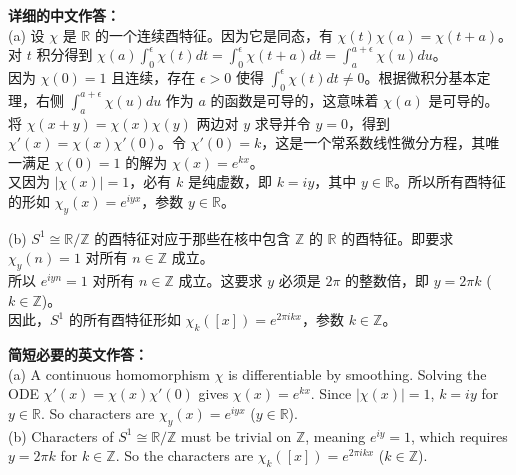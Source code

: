 \documentclass{ctexart}
\begin{document}
\vspace{1em}
\textbf{详细的中文作答：}\\
(a) 设 $\chi$ 是 $\mathbb{R}$ 的一个连续酉特征。因为它是同态，有 $\chi(t) \chi(a) = \chi(t+a)$。对 $t$ 积分得到 $\chi(a) \int_0^\epsilon \chi(t)dt = \int_0^\epsilon \chi(t+a)dt = \int_a^{a+\epsilon} \chi(u)du$。\\
因为 $\chi(0)=1$ 且连续，存在 $\epsilon > 0$ 使得 $\int_0^\epsilon \chi(t)dt \neq 0$。根据微积分基本定理，右侧 $\int_a^{a+\epsilon} \chi(u)du$ 作为 $a$ 的函数是可导的，这意味着 $\chi(a)$ 是可导的。\\
将 $\chi(x+y) = \chi(x)\chi(y)$ 两边对 $y$ 求导并令 $y=0$，得到 $\chi'(x) = \chi(x)\chi'(0)$。令 $\chi'(0) = k$，这是一个常系数线性微分方程，其唯一满足 $\chi(0)=1$ 的解为 $\chi(x) = e^{kx}$。\\
又因为 $|\chi(x)| = 1$，必有 $k$ 是纯虚数，即 $k = iy$，其中 $y \in \mathbb{R}$。所以所有酉特征的形如 $\chi_y(x) = e^{iyx}$，参数 $y \in \mathbb{R}$。

(b) $S^1 \cong \mathbb{R}/\mathbb{Z}$ 的酉特征对应于那些在核中包含 $\mathbb{Z}$ 的 $\mathbb{R}$ 的酉特征。即要求 $\chi_y(n) = 1$ 对所有 $n \in \mathbb{Z}$ 成立。\\
所以 $e^{iyn} = 1$ 对所有 $n \in \mathbb{Z}$ 成立。这要求 $y$ 必须是 $2\pi$ 的整数倍，即 $y = 2\pi k$ ($k \in \mathbb{Z}$)。\\
因此，$S^1$ 的所有酉特征形如 $\chi_k([x]) = e^{2\pi i k x}$，参数 $k \in \mathbb{Z}$。

\vspace{1em}
\textbf{简短必要的英文作答：}\\
(a) A continuous homomorphism $\chi$ is differentiable by smoothing. Solving the ODE $\chi'(x) = \chi(x)\chi'(0)$ gives $\chi(x) = e^{kx}$. Since $|\chi(x)|=1$, $k=iy$ for $y \in \mathbb{R}$. So characters are $\chi_y(x) = e^{iyx}$ ($y \in \mathbb{R}$).\\
(b) Characters of $S^1 \cong \mathbb{R}/\mathbb{Z}$ must be trivial on $\mathbb{Z}$, meaning $e^{iy} = 1$, which requires $y = 2\pi k$ for $k \in \mathbb{Z}$. So the characters are $\chi_k([x]) = e^{2\pi i k x}$ ($k \in \mathbb{Z}$).

\vspace{2em}
\end{document}
